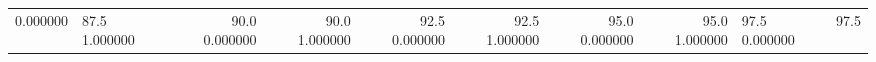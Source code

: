\begin{table}
\begin{tabular}{llrrrrrr}
0.000000 & 87.5%
1.000000 & 90.0%
0.000000 & 90.0%
1.000000 & 92.5%
0.000000 & 92.5%
1.000000 & 95.0%
0.000000 & 95.0%
1.000000 & 97.5%
0.000000 & 97.5%
\end{tabular}
\end{table}
